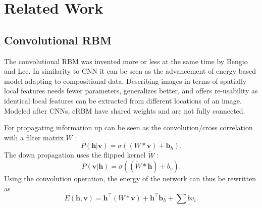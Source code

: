 \chapter{Related Work}
\section{Convolutional RBM}

The convolutional RBM was invented more or less at the same time by Bengio and Lee. 
In similarity to CNN it can be seen as the advancement of energy based model adapting to compositional data.
Describing images in terms of spatially local features needs fewer parameters, generalizes better, and offers re-usability as identical local features can be extracted from different locations of an image.
Modeled after CNNs, cRBM have shared weights and are not fully connected.


For propagating information up can be seen as the convolution/cross correlation with a filter matrix $W$ : 
\[
P(\textbf{h} | \textbf{v}) = \sigma((W * \textbf{v}) + \textbf{b}_{h}).
\]
The down propagation uses the flipped kernel $\tilde{W}$ :
\[
P(\textbf{v}| \textbf{h}) = \sigma((\tilde{W} * \textbf{h}) + b_v).
\]
Using the convolution operation, the energy of the network can thus be rewritten as
\[
E(\textbf{h} , \textbf{v}) = \textbf{h}^\intercal(W * \textbf{v}) + \textbf{h}^\intercal \textbf{b}_{h} + \sum b v_i.
\]




